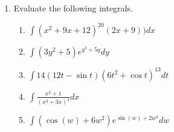 \documentclass[12pt]{article}
\begin{document}
\begin{enumerate}
\newpage
\item Evaluate the following integrals. 
\begin{enumerate}
\item $\int(x^2+9x+12)^{20}(2x+9))dx$
\vspace{3cm}
\item $\int(3y^2+5)e^{y^3+5y}dy$
\vspace{3cm}
\item $\int14(12t-\sin t)(6t^2+\cos t)^{13}dt$
\vspace{3cm}
\item $\int\frac{x^2+1}{(x^3+3x)^4}dx$
\vspace{3cm}
\item $\int(\cos(w)+6w^2)e^{\sin(w)+2w^3}dw$
\end{enumerate}
\end{enumerate}
\end{document}
